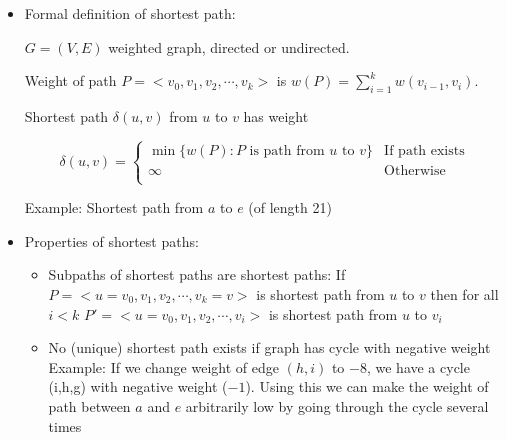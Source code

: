 \documentclass[twoside,12pt,a4paper,english]{book}
\theoremstyle{definition}
\theoremstyle{problemstyle}
\begin{document}
\begin{itemize}
\item Formal definition of shortest path: 

  $G = (V,E)$ weighted graph, directed or undirected. 

Weight of path $P = <v_0,v_1,v_2, \cdots, v_k>$ is $w(P) =
  \sum_{i=1}^k w(v_{i-1},v_i)$. 

Shortest path $\delta(u,v)$ from $u$ to $v$ has weight
  
  \[ \delta(u,v) = \left\{ \begin{array}{ll}
                \min\{w(P): \mbox{$P$ is path from $u$ to $v$}\} & \mbox{If
                  path exists} \\
                \infty                                     & \mbox{Otherwise} \\
              \end{array} \right. \]
            
            Example: Shortest path from $a$ to $e$ (of length 21) \\

            \centerline{}
            
\item Properties of shortest paths:
            
\begin{itemize}
\item Subpaths of shortest paths are shortest paths: If $P =
  <u=v_0,v_1,v_2, \cdots, v_k=v>$ is shortest path from $u$ to $v$
  then for all $i<k$ $P'= <u=v_0,v_1,v_2, \cdots, v_i>$ is shortest
  path from $u$ to $v_i$
  
  
\item No (unique) shortest path exists if graph has cycle with
  negative weight \\
  
  Example: If we change weight of edge $(h,i)$ to $-8$, we have a
  cycle (i,h,g) with negative weight ($-1$). Using this we can make the 
  weight of path between $a$ and $e$ arbitrarily low by going through
  the cycle several times \\
  
  \centerline{}
  

\end{itemize}
\end{itemize}
\end{document}
